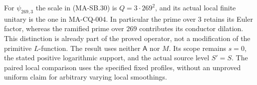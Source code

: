 For $\psi_{269,3}$ the scale in (MA-SB.30) is
$Q=3\cdot269^2$, and its actual local finite
unitary is the one in MA-CQ-004.  In particular the
prime over $3$ retains its Euler factor, whereas
the ramified prime over $269$ contributes its
conductor dilation.  This distinction is already
part of the proved operator, not a modification
of the primitive $L$-function.
The result uses neither $\mathsf A$ nor $M$.
Its scope remains $s=0$, the stated positive
logarithmic support, and the actual source level
$S'=S$.  The paired local comparison uses the
specified fixed profiles, without an unproved
uniform claim for arbitrary varying local smoothings.
